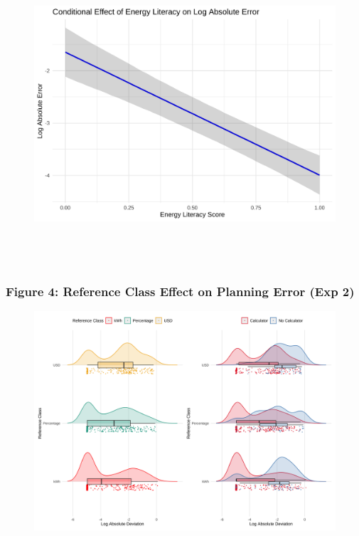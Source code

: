 \documentclass[
  12pt,
]{article}
\begin{document}
\begin{multicols}{3}
\begin{figure}[H]
{\begin{minipage}[t]{0.44\linewidth}
{    \includegraphics[height=4.4in, keepaspectratio]{assets/images/fig-s1-els-1.png}
    }
  \end{minipage}
}

\end{figure}

\columnbreak

\subsubsection{Figure 4: Reference Class Effect on Planning Error (Exp
2)}\label{figure-4-reference-class-effect-on-planning-error-exp-2}

\begin{figure}[H]

{\centering \includegraphics[width=0.85\linewidth,height=\textheight,keepaspectratio]{assets/images/fig-s2-log-dist-1.png}

}
\end{figure}
\end{multicols}
\end{document}
